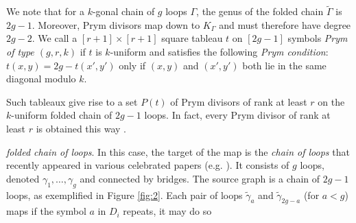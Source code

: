 \documentclass[11pt,reqno]{amsart}
\makeatletter
\newcommand*{\Z}{\mathbb{Z}}
\newcommand*{\abs}[1]{{\lvert #1 \rvert}}
\newcommand*{\ang}[1]{{\langle #1 \rangle}}
\newcommand*{\ti}[1]{\tilde{#1}}
\newcommand*{\wti}[1]{\widetilde{#1}}
\let\@@pmod\pmod
\DeclareRobustCommand{\pmod}{\@ifstar\@pmods\@@pmod}
\def\@pmods#1{\mkern4mu({\operator@font mod}\mkern 6mu#1)}
\DeclareMathOperator{\codim}{codim}
\theoremstyle{definition}
\theoremstyle{problem}
\theoremstyle{plain}
\theoremstyle{remark}
\theoremstyle{theorem}
\numberwithin{equation}{section}
\numberwithin{figure}{section}
\theoremstyle{definition}
\theoremstyle{problem}
\theoremstyle{plain}
\makeatother
\begin{document}
We note that for a $k$-gonal chain of $g$ loops $\Gamma$, the genus of
the folded chain $\wti \Gamma$ is $2g-1$.  Moreover, Prym divisors map
down to $K_\Gamma$ and must therefore have degree $2g-2$. We call a
$[r+1]\times [r+1]$ square tableau $t$ on $[2g-1]$ symbols \emph{Prym
  of type $(g,r,k)$} if $t$ is $k$-uniform and satisfies the following
\textit{Prym condition}: $t(x,y)=2g - t(x',y')$ only if $(x,y)$ and
$(x',y')$ both lie in the same diagonal modulo $k$.

Such tableaux give rise to a set $P(t)$ 
of Prym divisors of rank at least $r$ on
the $k$-uniform folded chain of $2g-1$ loops. In fact, every
Prym divisor of rank at least $r$ is obtained this way \cite[Corollary
5.3.10]{len2019skeletons}. 






\emph{folded chain of loops}. In this case, the target of the map is
the \emph{chain of loops} that recently appeared in various celebrated
papers (e.g. \cite{MRC, Pflueger, JR}). It consists of $g$ loops,
denoted  $\gamma_1,\ldots,\gamma_g$ and connected by bridges. The
source graph is a chain of $2g-1$ loops, as exemplified in Figure
\ref{fig:2}.  Each pair of loops $\ti\gamma_a$ and $\ti\gamma_{2g-a}$
(for $a<g$) maps  if the symbol $a$ in $D_i$ repeats, it may do so
\end{document}
